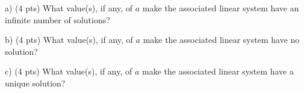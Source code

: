 \documentclass{article}
\begin{document}
\begin{flushleft}
a) (4 pts) What value(s), if any, of $a$ make the associated linear system have an infinite number of solutions?

\vspace{1.5in}

b) (4 pts) What value(s), if any, of $a$ make the associated linear system have no solution?

\vspace{1.5in}

c) (4 pts) What value(s), if any, of $a$ make the associated linear system have a unique solution?

\end{flushleft}
\end{document}

